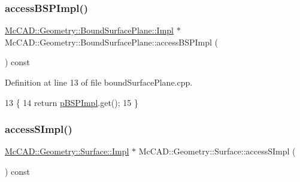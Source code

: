 \mbox{\label{classMcCAD_1_1Geometry_1_1BoundSurfacePlane_a81a714b3b2d58f42eeec6ec9ba300b3d}} 
\subsubsection{\texorpdfstring{access\+B\+S\+P\+Impl()}{accessBSPImpl()}\hspace{0.1cm}{\footnotesize\ttfamily [2/2]}}
{\footnotesize\ttfamily \hyperlink{classMcCAD_1_1Geometry_1_1BoundSurfacePlane_1_1Impl}{Mc\+C\+A\+D\+::\+Geometry\+::\+Bound\+Surface\+Plane\+::\+Impl} $\ast$ Mc\+C\+A\+D\+::\+Geometry\+::\+Bound\+Surface\+Plane\+::access\+B\+S\+P\+Impl (\begin{DoxyParamCaption}{ }\end{DoxyParamCaption}) const}



Definition at line 13 of file bound\+Surface\+Plane.\+cpp.


\begin{DoxyCode}
13                                                    \{
14   \textcolor{keywordflow}{return} \hyperlink{classMcCAD_1_1Geometry_1_1BoundSurfacePlane_a4e6fab5cba3cc226ad29f679bd3886ce}{pBSPImpl}.get();
15 \}
\end{DoxyCode}
\mbox{\label{classMcCAD_1_1Geometry_1_1Surface_a989de1f9ebe3de043412014ed25e52eb}} 
\subsubsection{\texorpdfstring{access\+S\+Impl()}{accessSImpl()}\hspace{0.1cm}{\footnotesize\ttfamily [1/2]}}
{\footnotesize\ttfamily \hyperlink{classMcCAD_1_1Geometry_1_1Surface_1_1Impl}{Mc\+C\+A\+D\+::\+Geometry\+::\+Surface\+::\+Impl} $\ast$ Mc\+C\+A\+D\+::\+Geometry\+::\+Surface\+::access\+S\+Impl (\begin{DoxyParamCaption}{ }\end{DoxyParamCaption}) const\hspace{0.3cm}{\ttfamily [inherited]}}



